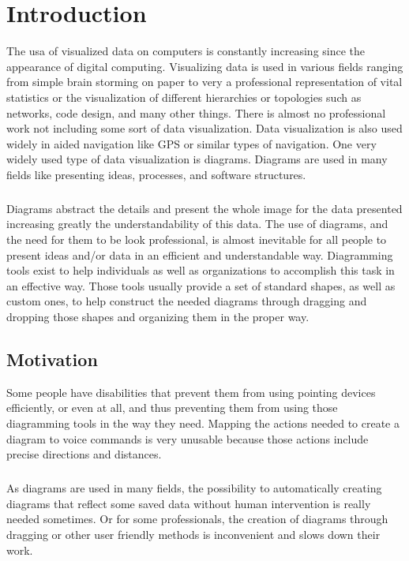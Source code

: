 \chapter{Introduction}
\beginchapter
The usa of visualized data on computers is constantly increasing since the appearance of digital computing. Visualizing data is used in various fields ranging from simple brain storming on paper to very a professional representation of vital statistics or the visualization of different hierarchies or topologies such as networks, code design, and many other things. There is almost no professional work not including some sort of data visualization.
Data visualization is also used widely in aided navigation like GPS or similar types of navigation.
One very widely used type of data visualization is diagrams. Diagrams are used in many fields like presenting ideas, processes, and software structures.

\paragraph{}
Diagrams abstract the details and present the whole image for the data presented increasing greatly the understandability of this data. The use of diagrams, and the need for them to be look professional, is almost inevitable for all people to present ideas and/or data in an efficient and understandable way. Diagramming tools exist to help individuals as well as organizations to accomplish this task in an effective way. Those tools usually provide a set of standard shapes, as well as custom ones, to help construct the needed diagrams through dragging and dropping those shapes and organizing them in the proper way.

\section{Motivation}
Some people have disabilities that prevent them from using pointing devices efficiently, or even at all, and thus preventing them from using those diagramming tools in the way they need. Mapping the actions needed to create a diagram to voice commands is very unusable because those actions include precise directions and distances.

\paragraph{}
As diagrams are used in many fields, the possibility to automatically creating diagrams that reflect some saved data without human intervention is really needed sometimes. Or for some professionals, the creation of diagrams through dragging or other user friendly methods is inconvenient and slows down their work.

